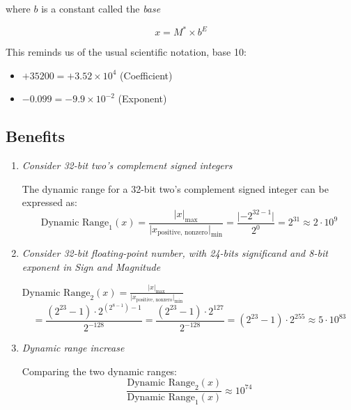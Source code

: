 \documentclass[12pt,openany, tikz,border=10pt]{book}
\begin{document}
			      	where \( b \) is a constant called the \textit{base}
			      	
			      	\[ x = M^* \times b^E \]
			      	
			      	This reminds us of the usual scientific notation, base 10:
			      	\begin{itemize}
			      		\item[] \( +35200 = +3.52 \times 10^4 \) (Coefficient)
			      		\item[] \( -0.099 = -9.9 \times 10^{-2} \) (Exponent)
			      	\end{itemize}
			      	
			      	\subsection{Benefits }
			      	\begin{enumerate}
			      		\item \textit{Consider 32-bit two's complement signed integers}
			      		          
			      		      The dynamic range for a 32-bit two's complement signed integer can be expressed as:
			      		      \begin{equation*}
			      		      	\text{Dynamic Range}_1 (x) = \frac{\lvert x \rvert_{\text{max}}}{\lvert x_{\text{positive, nonzero}} \rvert_{\text{min}}} = \frac{\lvert -2^{32-1} \rvert}{2^0} = 2^{31} \approx 2 \cdot 10^9
			      		      \end{equation*}
			      		          
			      		\item \textit{Consider 32-bit floating-point number, with 24-bits significand and 8-bit exponent in Sign and Magnitude}
			      		             
			      		      {$\text{Dynamic Range}_2 (x) = \frac{\lvert x \rvert_{\text{max}}}{\lvert x_{\text{positive, nonzero}} \rvert_{\text{min}}}$ $$= \frac{(2^{23} - 1) \cdot 2^{(2^{8-1}) - 1}}{2^{-128}} = \frac{(2^{23} - 1) \cdot 2^{127}}{2^{-128}} = (2^{23} - 1) \cdot 2^{255} \approx 5 \cdot 10^{83}$$}
			      		      
			      		          
			      		\item \textit{Dynamic range increase}
			      		          
			      		      Comparing the two dynamic ranges:
			      		      \begin{equation*}
			      		      	\frac{\text{Dynamic Range}_2 (x)}{\text{Dynamic Range}_1 (x)} \approx 10^{74}
			      		      \end{equation*}
			      	\end{enumerate}
			      	\newpage
			      	
\end{document}
